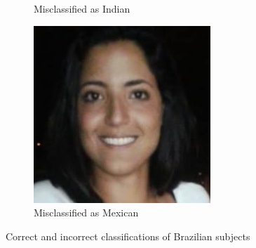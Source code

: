 \begin{figure}
\begin{subfigure}[b]{0.3\textwidth}
      \caption{Misclassified as Indian}
    \end{subfigure}
    \begin{subfigure}[b]{0.3\textwidth}
        \includegraphics[width=\textwidth]{figures/results/misclassification/brazil-mexico.jpg}
      \caption{Misclassified as Mexican}
    \end{subfigure}
\caption{Correct and incorrect classifications of Brazilian subjects}
\label{fig:results:dc:misclass:brazil}
\end{figure}

